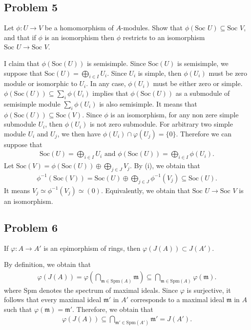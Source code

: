 \subsection*{Problem 5}
Let $\phi : U \to V$ be a homomorphism of $A$-modules. Show that $\phi(\text{Soc } U) \subseteq \text{Soc } V$, and that if $\phi$ is an isomorphism then $\phi$ restricts to an isomorphism $\text{Soc } U \to \text{Soc } V$.
\begin{solution}
    I claim that $\phi(\text{Soc}(U))$ is semisimple. Since $\text{Soc}(U)$ is semisimple, we suppose that $\text{Soc}(U)=\bigoplus_{i\in I} U_i$.
    Since $U_i$ is simple, then $\phi(U_i)$ must be zero module or isomorphic to $U_i$.
    In any case, $\phi(U_i)$ must be either zero or simple. $\phi(\text{Soc}(U))\subseteq \sum_{i} \phi(U_i)$ implies that $\phi(\text{Soc}(U))$ as a submodule of 
    semisimple module $ \sum_{i} \phi(U_i)$ is also semisimple. It means that $\phi(\text{Soc}(U)) \subseteq \text{Soc}(V)$.
    Since $\phi$ is an isomorphism, for any non zere simple submodule $U_i$, then $\phi(U_i)$ is not zero submodule. For arbitrary two simple module $U_i$ and $U_j$, we then have $\phi(U_i)\cap \varphi(U_j)=\{0\}$.
    Therefore we can suppose that 
    \begin{align*}
        \text{Soc}(U)= \bigoplus_{i\in I}U_i \text{ and }  \phi(\text{Soc}(U))= \bigoplus_{i\in I}\phi(U_i).
    \end{align*}
    Let $\text{Soc}(V) = \phi(\text{Soc}(U))\oplus \bigoplus_{j\in J}V_j$. By (i), we obtain that 
    \begin{align*}
        \phi^{-1}(\text{Soc}(V))=\text{Soc}(U)\oplus  \bigoplus_{j\in J}\phi^{-1}(V_j)\subseteq \text{Soc}(U).
    \end{align*}
    It means $V_j\simeq \phi^{-1}(V_j)\simeq (0)$. Equivalently, we obtain that $\text{Soc } U \to \text{Soc } V$ is an isomorphism.
\end{solution}


\subsection*{Problem 6}
If $\varphi : A \to A'$ is an epimorphism of rings, then $\varphi(J(A)) \subset J(A')$.
\begin{solution}
    By definition, we obtain that 
    \begin{align*}
        \varphi(J(A))=\varphi\left(\bigcap_{\mathfrak{m}\in \text{Spm}(A)}\mathfrak{m}\right)\subseteq  \bigcap_{\mathfrak{m}\in \text{Spm}(A)}\varphi(\mathfrak{m}).
    \end{align*}
    where Spm denotes the spectrum of maximal ideals.
    Since $\varphi$ is surjective, it follows that every maximal ideal $\mathfrak{m}'$ in $A'$ corresponds to a maximal ideal $\mathfrak{m}$ in $A$
    such that $\varphi(\mathfrak{m})=\mathfrak{m}'$. Therefore, we obtain that 
    \begin{align*}
        \varphi(J(A))\subseteq \bigcap_{\mathfrak{m}'\in \text{Spm}(A')}\mathfrak{m}' = J(A').
    \end{align*}
\end{solution}

